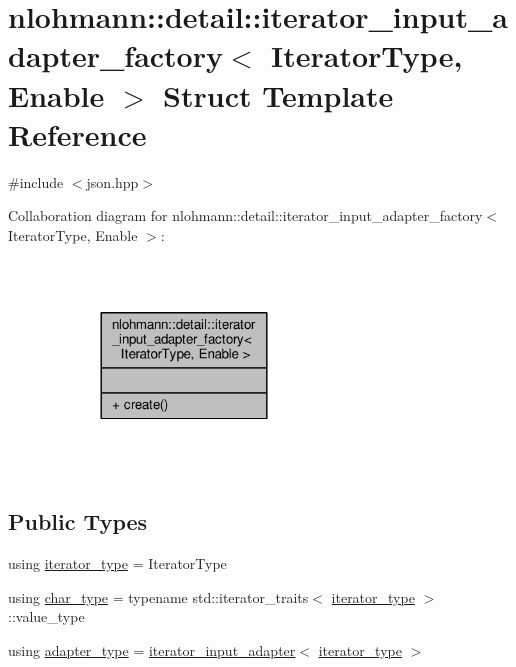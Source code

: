 \hypertarget{structnlohmann_1_1detail_1_1iterator__input__adapter__factory}{}\section{nlohmann\+:\+:detail\+:\+:iterator\+\_\+input\+\_\+adapter\+\_\+factory$<$ Iterator\+Type, Enable $>$ Struct Template Reference}
\label{structnlohmann_1_1detail_1_1iterator__input__adapter__factory}


{\ttfamily \#include $<$json.\+hpp$>$}



Collaboration diagram for nlohmann\+:\+:detail\+:\+:iterator\+\_\+input\+\_\+adapter\+\_\+factory$<$ Iterator\+Type, Enable $>$\+:
\nopagebreak
\begin{figure}[H]
\begin{center}
\leavevmode
\includegraphics[width=204pt]{structnlohmann_1_1detail_1_1iterator__input__adapter__factory__coll__graph}
\end{center}
\end{figure}
\subsection*{Public Types}
\begin{DoxyCompactItemize}
\item 
using \hyperlink{structnlohmann_1_1detail_1_1iterator__input__adapter__factory_a37663ca283012236415d53145da1a0f9}{iterator\+\_\+type} = Iterator\+Type
\item 
using \hyperlink{structnlohmann_1_1detail_1_1iterator__input__adapter__factory_a1439c0eda85f5f67199374d3254b8f2a}{char\+\_\+type} = typename std\+::iterator\+\_\+traits$<$ \hyperlink{structnlohmann_1_1detail_1_1iterator__input__adapter__factory_a37663ca283012236415d53145da1a0f9}{iterator\+\_\+type} $>$\+::value\+\_\+type
\item 
using \hyperlink{structnlohmann_1_1detail_1_1iterator__input__adapter__factory_a264935c57ca29dfb5153ade55266d1fa}{adapter\+\_\+type} = \hyperlink{classnlohmann_1_1detail_1_1iterator__input__adapter}{iterator\+\_\+input\+\_\+adapter}$<$ \hyperlink{structnlohmann_1_1detail_1_1iterator__input__adapter__factory_a37663ca283012236415d53145da1a0f9}{iterator\+\_\+type} $>$
\end{DoxyCompactItemize}
